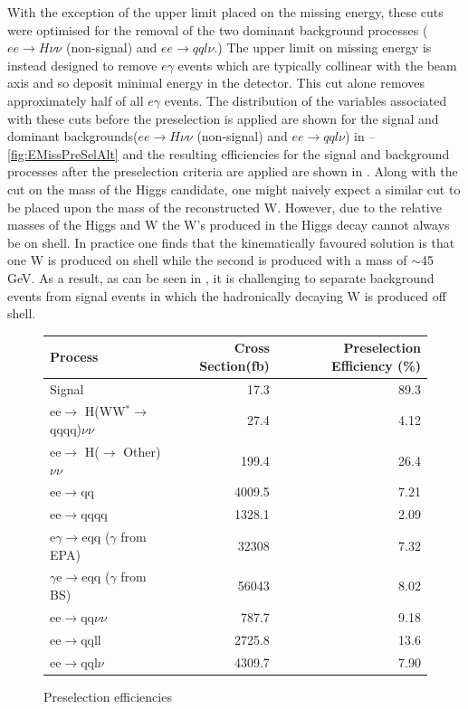 With the exception of the upper limit placed on the missing energy, these cuts were optimised for the removal of the two dominant background processes ($ee\rightarrow H\nu\nu$ (non-signal) and $ee\rightarrow qql\nu$.) The upper limit on missing energy is instead designed to remove $e\gamma$ events which are typically collinear with the beam axis and so deposit minimal energy in the detector. This cut alone removes approximately half of all $e\gamma$ events. The distribution of the variables associated with these cuts before the preselection is applied are shown for the signal and dominant backgrounds($ee\rightarrow H\nu\nu$ (non-signal) and $ee\rightarrow qql\nu$) in --\ref{fig:EMissPreSelAlt} and the resulting efficiencies for the signal and background processes after the preselection criteria are applied are shown in . Along with the cut on the mass of the Higgs candidate, one might naively expect a similar cut to be placed upon the mass of the reconstructed W. However, due to the relative masses of the Higgs and W the W's produced in the Higgs decay cannot always be on shell. In practice one finds that the kinematically favoured solution is that one W is produced on shell while the second is produced with a mass of $\sim$45 GeV. As a result, as can be seen in , it is challenging to separate background events from signal events in which the hadronically decaying W is produced off shell.

\begin{figure}
  \centering
  \begin{tabular}{l r r }
   \toprule
    Process & Cross Section(fb) & Preselection Efficiency (\%)     \\
    \midrule
    Signal             & 17.3    &   89.3 \\ 
    \midrule
    ee$\rightarrow$ H(WW$^*\rightarrow$qqqq)$\nu\nu$  & 27.4    &  4.12  \\
    \midrule
    ee$\rightarrow$ H($\rightarrow$ Other)$\nu\nu$ & 199.4 & 26.4  \\
    \midrule
    ee$\rightarrow$qq               & 4009.5    &  7.21 \\ 
    \midrule
    ee$\rightarrow$qqqq               & 1328.1    &  2.09  \\ 
    \midrule
    e$\gamma$$\rightarrow$eqq ($\gamma$ from EPA)                 & 32308    & 7.32   \\ 
    \midrule
    $\gamma$e$\rightarrow$eqq ($\gamma$ from BS)               &  56043   &  8.02 \\ 
    \midrule
    ee$\rightarrow$qq$\nu\nu$               & 787.7    & 9.18  \\ 
    \midrule
    ee$\rightarrow$qqll               & 2725.8    &   13.6 \\ 
    \midrule
    ee$\rightarrow$qql$\nu$              & 4309.7    &  7.90  \\ 
    \bottomrule
  \end{tabular}
  \caption[Preselection efficiencies]{Preselection efficiencies}
  \label{fig:preseleff}
\end{figure}



